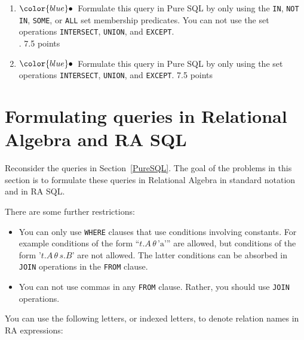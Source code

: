 \documentclass[11pt]{article}
\newcommand{\blue}[1]{{\color{blue}#1}}
\newcommand{\bluebullet}{$\blue{\bullet}$}
\begin{document}
\begin{enumerate}[resume]
\begin{enumerate}
\item  \bluebullet\ Formulate this query in Pure SQL by only using the {\tt  IN}, {\tt NOT IN}, {\tt SOME}, or {\tt ALL} set membership predicates.
You can not use the set operations {\tt INTERSECT}, {\tt UNION}, and {\tt EXCEPT}. \\ . \hfill 7.5 points

\item  \bluebullet\   Formulate this query in Pure SQL by only using the set operations {\tt INTERSECT}, {\tt UNION}, and {\tt EXCEPT}.  \hfill 7.5 points

\end{enumerate}

\end{enumerate}

\newpage

\section{Formulating queries in Relational Algebra and RA SQL}

Reconsider the queries in Section~\ref{PureSQL}.   The goal of the problems in this section
is to formulate these queries in Relational Algebra in standard notation and in RA SQL.  

There are some further restrictions:
\begin{itemize}
\item You can only use {\tt WHERE} clauses that use 
conditions involving constants.   For example conditions of the form ``$t.A\, \theta\, \text{'a'}$'' are allowed, but conditions of the 
form '$t.A\, \theta\, s.B$' are not allowed.   The latter conditions can be absorbed in {\tt JOIN} operations in the {\tt FROM} clause.
\item You can not use commas in any {\tt FROM} clause.  Rather, you should use {\tt JOIN} operations.
\end{itemize}

You can use the following letters, or indexed letters, to denote relation names in RA expressions:

\begin{center}
\end{center}
\end{document}
